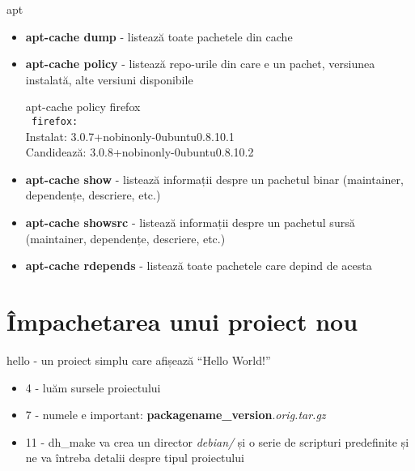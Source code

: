 \documentclass{beamer}
\begin{document}
\begin{frame}{apt}
  \begin{itemize}
  \item \textbf{apt-cache dump} - listează toate pachetele din cache
  \item \textbf{apt-cache policy} - listează repo-urile din care e un pachet, versiunea instalată, alte versiuni disponibile
    \begin{beamerboxesrounded}[lower=block body,shadow=true,width=8cm]{}
      apt-cache policy firefox \\
      \texttt{   firefox:}\\
      Instalat: 3.0.7+nobinonly-0ubuntu0.8.10.1 \\
      Candidează: 3.0.8+nobinonly-0ubuntu0.8.10.2
    \end{beamerboxesrounded}
  \item \textbf{apt-cache show} - listează informații despre un pachetul binar (maintainer, dependențe, descriere, etc.)
  \item \textbf{apt-cache showsrc} - listează informații despre un pachetul sursă (maintainer, dependențe, descriere, etc.)
  \item \textbf{apt-cache rdepends} - listează toate pachetele care depind de acesta
  \end{itemize}
\end{frame}


\section{Împachetarea unui proiect nou}
\frame{\tableofcontents[currentsection]}

\begin{frame}{hello - un proiect simplu care afișează ``Hello World!''}
  \begin{itemize}
    \begin{beamerboxesrounded}[lower=block body,shadow=true]{1\_wget.sh - modificați numele și adresa înainte de rulare}
      \small 
    \end{beamerboxesrounded}
  \item 4 - luăm sursele proiectului
  \item 7 - numele e important: \textbf{packagename\_version}.\textit{orig.tar.gz}
  \item 11 - dh\_make va crea un director \textit{debian/} și o serie 
    de scripturi predefinite și ne va întreba detalii despre tipul proiectului
  \end{itemize}
\end{frame}
\end{document}
